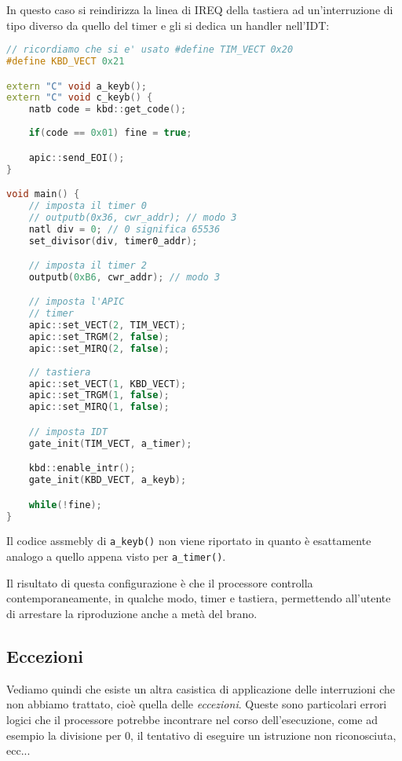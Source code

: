 \documentclass[a4paper,11pt]{article}
\begin{document}
In questo caso si reindirizza la linea di IREQ della tastiera ad un'interruzione di tipo diverso da quello del timer e gli si dedica un handler nell'IDT:
\begin{lstlisting}[language=C++, style=codestyle]	
// ricordiamo che si e' usato #define TIM_VECT 0x20
#define KBD_VECT 0x21

extern "C" void a_keyb();
extern "C" void c_keyb() {
	natb code = kbd::get_code();
	
	if(code == 0x01) fine = true;

	apic::send_EOI();
}

void main() {
	// imposta il timer 0
	// outputb(0x36, cwr_addr); // modo 3
	natl div = 0; // 0 significa 65536
	set_divisor(div, timer0_addr);

	// imposta il timer 2
	outputb(0xB6, cwr_addr); // modo 3

	// imposta l'APIC
	// timer
	apic::set_VECT(2, TIM_VECT);
	apic::set_TRGM(2, false);
	apic::set_MIRQ(2, false);
	
	// tastiera
	apic::set_VECT(1, KBD_VECT);
	apic::set_TRGM(1, false);
	apic::set_MIRQ(1, false);

	// imposta IDT
	gate_init(TIM_VECT, a_timer);

	kbd::enable_intr();
	gate_init(KBD_VECT, a_keyb);

	while(!fine);
}
\end{lstlisting}

Il codice assmebly di \lstinline|a_keyb()| non viene riportato in quanto è esattamente analogo a quello appena visto per \lstinline|a_timer()|.

Il risultato di questa configurazione è che il processore controlla contemporaneamente, in qualche modo, timer e tastiera, permettendo all'utente di arrestare la riproduzione anche a metà del brano.

\subsection{Eccezioni}
Vediamo quindi che esiste un altra casistica di applicazione delle interruzioni che non abbiamo trattato, cioè quella delle \textit{eccezioni}.
Queste sono particolari errori logici che il processore potrebbe incontrare nel corso dell'esecuzione, come ad esempio la divisione per 0, il tentativo di eseguire un istruzione non riconosciuta, ecc...
\end{document}
